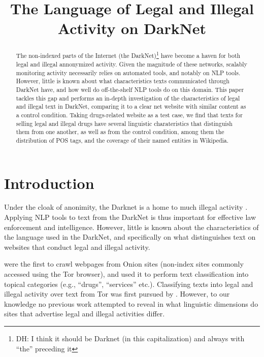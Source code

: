 \documentclass[11pt,a4paper]{article}
\title{The Language of Legal and Illegal Activity on DarkNet}
\date{}
\newcommand{\daniel}[1]{\footnote{\color{brown}DH: #1}}
\begin{document}
\maketitle

\begin{abstract}
  The non-indexed parts of the Internet (the DarkNet)\daniel{I think it should be Darknet (in this capitalization) and always with ``the'' preceding it}
   have become a haven for both legal and illegal annonymized activity.
  Given the magnitude of these networks, scalably monitoring activity necessarily relies
    on automated tools, and notably on NLP tools.
  However, little is known about what characteristics texts communicated through DarkNet have, 
    and how well do off-the-shelf NLP tools do on this domain.
  This paper tackles this gap and performs an in-depth investigation of the characteristics
    of legal and illegal text in DarkNet, comparing it to a clear net website with similar
    content as a control condition.
  Taking drugs-related website as a test case, we find that texts for selling legal and illegal drugs
    have several linguistic charateristics that distinguish them from one another, as well as from 
    the control condition, among them the distribution of POS tags, and the coverage of their named entities in Wikipedia.
\end{abstract}



\section{Introduction}
  
  Under the cloak of anonimity, the Darknet is a home to much illegal activity \citep{moore2016cryptopolitik}.
  Applying NLP tools to text from the DarkNet is thus important for effective law enforcement and intelligence.
  However, little is known about the characteristics of the language used in the DarkNet, 
  and specifically on what distinguishes text on websites that conduct legal and illegal activity.
  
  \citet{AlNabki17} were the first to crawl webpages from Onion sites (non-index sites commonly accessed using the Tor browser), 
  and used it to perform text classification into topical categories (e.g., ``drugs'', ``services'' etc.).
  Classifying texts into legal and illegal activity over text from Tor was first pursued by \citet{Avarikioti18}.
  However, to our knowledge no previous work attempted to reveal in what linguistic dimensions do sites that advertise
  legal and illegal activities differ. 
  
\end{document}
